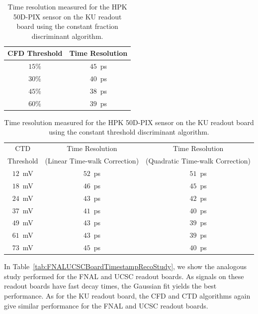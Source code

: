 \documentclass[preprint,1p]{elsarticle}
\begin{document}
\begin{table}[!htb]
\scriptsize
\begin{center}
  \begin{tabular}{ |c | c | }
    \hline
    CFD Threshold & Time Resolution \\ \hline
    $15\%$ & $45$~ps \\       
    $30\%$ & $40$~ps \\       
    $45\%$ & $38$~ps \\       
    $60\%$ & $39$~ps \\       
    \hline
  \end{tabular}
\caption{Time resolution measured for the HPK 50D-PIX sensor on the KU readout board using
the constant fraction discriminant algorithm.}  
\label{tab:KUBoardCFD}
\end{center}
\end{table}

\begin{table}[!htb]
\scriptsize
\begin{center}
  \begin{tabular}{ |c | c | c | }
    \hline
    CTD         & Time Resolution & Time Resolution   \\ 
    Threshold   & (Linear Time-walk Correction) & (Quadratic Time-walk Correction)  \\ \hline 
    $12$~mV & $52$~ps & $51$~ps \\       
    $18$~mV & $46$~ps & $45$~ps \\       
    $24$~mV & $43$~ps & $42$~ps \\       
    $37$~mV & $41$~ps & $40$~ps \\       
    $49$~mV & $43$~ps & $39$~ps \\       
    $61$~mV & $43$~ps & $39$~ps \\       
    $73$~mV & $45$~ps & $40$~ps \\       
    \hline
  \end{tabular}
\caption{Time resolution measured for the HPK 50D-PIX sensor on the KU readout board using
the constant threshold discriminant algorithm.}  
\label{tab:KUBoardCTD}
\end{center}
\end{table}

In Table~\ref{tab:FNALUCSCBoardTimestampRecoStudy}, we show the analogous study performed
for the FNAL and UCSC readout boards. As signals on these readout boards have fast decay
times, the Gaussian fit yields the best performance. As for the KU readout board, 
the CFD and CTD algorithms again give similar performance 
for the FNAL and UCSC readout boards.
\end{document}
